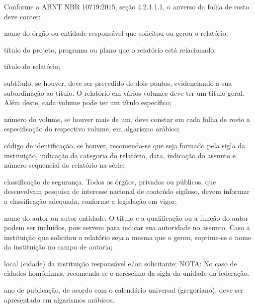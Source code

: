 \documentclass[
	12pt,				%
	openany,			%
	twoside,			%
	a4paper,			%
	english,			%
	french,				%
	spanish,			%
	brazil,				%
	]{abntex2}
\begin{document}

\frenchspacing 


\imprimircapa

\imprimirfolhaderosto*

\iffalse

{
\ABNTEXchapterfont

\vspace*{\fill}

Conforme a ABNT NBR 10719:2015, seção 4.2.1.1.1, o anverso da folha de rosto
deve conter:

\begin{alineas}
  \item nome do órgão ou entidade responsável que solicitou ou gerou o
   relatório; 
  \item título do projeto, programa ou plano que o relatório está relacionado;
  \item título do relatório;
  \item subtítulo, se houver, deve ser precedido de dois pontos, evidenciando a
   sua subordinação ao título. O relatório em vários volumes deve ter um título
   geral. Além deste, cada volume pode ter um título específico; 
  \item número do volume, se houver mais de um, deve constar em cada folha de
   rosto a especificação do respectivo volume, em algarismo arábico; 
  \item código de identificação, se houver, recomenda-se que seja formado
   pela sigla da instituição, indicação da categoria do relatório, data,
   indicação do assunto e número sequencial do relatório na série; 
  \item classificação de segurança. Todos os órgãos, privados ou públicos, que
   desenvolvam pesquisa de interesse nacional de conteúdo sigiloso, devem
    informar a classificação adequada, conforme a legislação em vigor; 
  \item nome do autor ou autor-entidade. O título e a qualificação ou a função
   do autor podem ser incluídos, pois servem para indicar sua autoridade no
   assunto. Caso a instituição que solicitou o relatório seja a mesma que o
   gerou, suprime-se o nome da instituição no campo de autoria; 
  \item local (cidade) da instituição responsável e/ou solicitante; NOTA: No
   caso de cidades homônimas, recomenda-se o acréscimo da sigla da unidade da
   federação.
  \item ano de publicação, de acordo com o calendário universal (gregoriano),
  deve ser apresentado em algarismos arábicos.
\end{alineas}

\vspace*{\fill}
}
\end{document}
